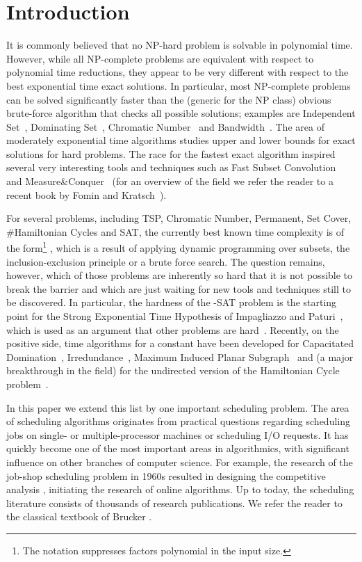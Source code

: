 \documentclass{article}
\theoremstyle{definition}
\begin{document}
\section{Introduction}

It is commonly believed that no NP-hard problem is solvable in polynomial time.
However, while all NP-complete problems are equivalent with respect to polynomial time reductions,
they appear to be very different with respect to the best exponential time exact solutions.
In particular, most NP-complete problems can be solved significantly faster than
the (generic for the NP class) obvious brute-force algorithm that checks all possible solutions;
examples are {\sc Independent Set}~\cite{fgk:m-c-jacm}, {\sc Dominating Set}~\cite{fgk:m-c-jacm,rooij:domsetesa09}, {\sc Chromatic Number}~\cite{bjohus:color} and
{\sc Bandwidth}~\cite{nasz-tcs}.
The area of moderately exponential time algorithms studies upper and lower bounds
for exact solutions for hard problems.
The race for the fastest exact algorithm inspired several very interesting tools
and techniques such as Fast Subset Convolution~\cite{bjohus:fourier} and Measure\&Conquer~\cite{fgk:m-c-jacm}
(for an overview of the field we refer the reader to a recent book by Fomin and Kratsch~\cite{fomin-book}).

For several problems, including {\sc TSP}, {\sc Chromatic Number}, {\sc Permanent},
{\sc Set Cover}, {\sc \#Hamiltonian Cycles} and {\sc SAT}, the currently best known time complexity
is of the form\footnote{The  notation suppresses factors polynomial in the input size.}
, which is a result of applying dynamic programming over subsets,
the inclusion-exclusion principle or a brute force search.
The question remains, however, which of those problems are inherently so hard that it is
not possible to break the  barrier and which are just waiting for new tools and techniques still to be discovered.
In particular, the hardness of the -{\sc SAT} problem is the starting point for the
Strong Exponential Time Hypothesis of Impagliazzo and Paturi~\cite{seth},
which is used as an argument that other problems are hard~\cite{cut-and-count,treewidth-lower,patrascu}.
Recently, on the positive side,  time algorithms for a constant  have been developed for
{\sc Capacitated Domination}~\cite{capdomset}, {\sc Irredundance}~\cite{irrset},
{\sc Maximum Induced Planar Subgraph}~\cite{fomin-esa11} and
(a major breakthrough in the field)
for the undirected version of the {\sc Hamiltonian Cycle} problem~\cite{bjorklund-focs}.

In this paper we extend this list by one important scheduling problem.
The area of scheduling algorithms originates from practical questions regarding scheduling jobs on single- or multiple-processor
machines or scheduling I/O requests. It has quickly become one of the most important areas in algorithmics, with significant influence on other branches of computer science.
For example, the research of the job-shop scheduling problem in 1960s resulted
in designing the competitive analysis \cite{graham:jobshop}, initiating the research of
online algorithms.
Up to today, the scheduling literature consists of thousands of research publications.
We refer the reader to the classical textbook of Brucker \cite{sched:book}.
\end{document}
